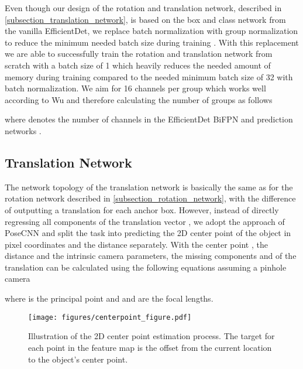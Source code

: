 \documentclass[twocolumn, 10pt, letterpaper]{article}
\begin{document}
Even though our design of the rotation and translation network, described in \autoref{subsection_translation_network}, is based on the box and class network from the vanilla EfficientDet, we replace batch normalization with group normalization to reduce the minimum needed batch size during training \cite{GroupNorm}. With this replacement we are able to successfully train the rotation and translation network from scratch with a batch size of 1 which heavily reduces the needed amount of memory during training compared to the needed minimum batch size of 32 with batch normalization. We aim for 16 channels per group which works well according to Wu \etal\cite{GroupNorm} and therefore calculating the number of groups  as follows

where  denotes the number of channels in the EfficientDet BiFPN and prediction networks \cite{EfficientDet}.

\subsection{Translation Network}
\label{subsection_translation_network}
The network topology of the translation network is basically the same as for the rotation network described in \autoref{subsection_rotation_network}, with the difference of outputting a translation  for each anchor box. However, instead of directly regressing all components of the translation vector , we adopt the approach of PoseCNN\cite{PoseCNN} and split the task into predicting the 2D center point  of the object in pixel coordinates and the distance  separately. With the center point , the distance  and the intrinsic camera parameters, the missing components  and  of the translation  can be calculated using the following equations assuming a pinhole camera




where  is the principal point and  and  are the focal lengths. \\

\begin{figure}
\centering
\texttt{[image: figures/centerpoint\_figure.pdf]}
\caption{Illustration of the 2D center point estimation process. The target for each point in the feature map is the offset from the current location to the object's center point.}
\label{figure_translation_centerpoint}
\end{figure}
\end{document}
